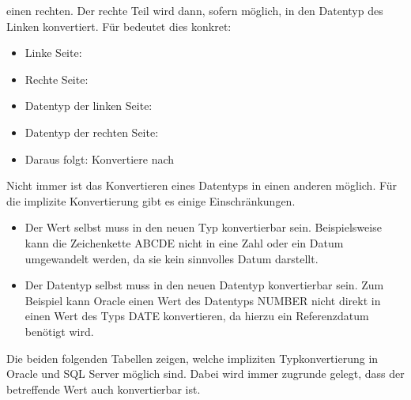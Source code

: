         einen rechten. Der rechte Teil wird dann, sofern möglich, in den
        Datentyp des Linken konvertiert. Für  bedeutet dies
        konkret:
        \begin{itemize}
          \item Linke Seite: 
          \item Rechte Seite: 
          \item Datentyp der linken Seite: 
          \item Datentyp der rechten Seite: 
          \item Daraus folgt: Konvertiere  nach 
        \end{itemize}
        Nicht immer ist das Konvertieren eines Datentyps in einen anderen möglich. Für die implizite Konvertierung gibt es einige Einschränkungen.
        \begin{itemize}
          \item Der Wert selbst muss in den neuen Typ konvertierbar sein. Beispielsweise kann die Zeichenkette ABCDE nicht in eine Zahl oder ein Datum umgewandelt werden, da sie kein sinnvolles Datum darstellt.
          \item Der Datentyp selbst muss in den neuen Datentyp konvertierbar sein. Zum Beispiel kann Oracle einen Wert des Datentyps NUMBER nicht direkt in einen Wert des Typs DATE konvertieren, da hierzu ein Referenzdatum benötigt wird.
        \end{itemize}
        Die beiden folgenden Tabellen zeigen, welche impliziten Typkonvertierung in Oracle und SQL Server möglich sind. Dabei wird immer zugrunde gelegt, dass der betreffende Wert auch konvertierbar ist.
